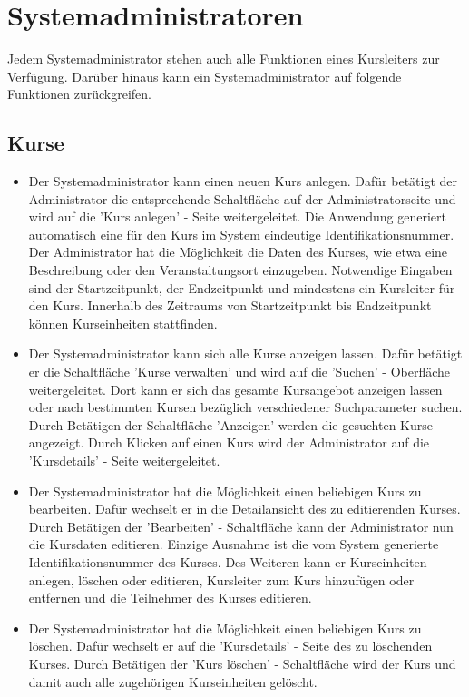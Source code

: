 \documentclass[a4paper]{scrreprt}
\newcounter{Lc}
\newcounter{Hc}
\newcommand{\stepHc}{\stepcounter{Hc}\setcounter{Lc}{0}}
\begin{document}
	\section{Systemadministratoren}
	Jedem Systemadministrator stehen auch alle Funktionen eines Kursleiters zur Verfügung. Darüber hinaus kann ein Systemadministrator auf folgende Funktionen zurückgreifen.
	\stepHc
		\subsection{Kurse}
			\begin{itemize}
				\item {}
					Der Systemadministrator kann einen neuen Kurs anlegen. Dafür betätigt der Administrator die entsprechende Schaltfläche auf der Administratorseite und wird auf die 'Kurs anlegen' - Seite weitergeleitet. Die Anwendung generiert automatisch eine für den Kurs im System eindeutige Identifikationsnummer. Der Administrator hat die Möglichkeit die Daten des Kurses, wie etwa eine Beschreibung oder den Veranstaltungsort einzugeben. Notwendige Eingaben sind der Startzeitpunkt, der Endzeitpunkt und mindestens ein Kursleiter für den Kurs. Innerhalb des Zeitraums von Startzeitpunkt bis Endzeitpunkt können Kurseinheiten stattfinden.
				\item {}
					Der Systemadministrator kann sich alle Kurse anzeigen lassen. Dafür betätigt er die Schaltfläche 'Kurse verwalten' und wird auf die 'Suchen' - Oberfläche weitergeleitet. Dort kann er sich das gesamte Kursangebot anzeigen lassen oder nach bestimmten Kursen bezüglich verschiedener Suchparameter suchen. Durch Betätigen der Schaltfläche 'Anzeigen' werden die gesuchten Kurse angezeigt. Durch Klicken auf einen Kurs wird der Administrator auf die 'Kursdetails' - Seite weitergeleitet.
				\item {}
					Der Systemadministrator hat die Möglichkeit einen beliebigen Kurs zu bearbeiten. Dafür wechselt er in die Detailansicht des zu editierenden Kurses. Durch Betätigen der 'Bearbeiten' - Schaltfläche  kann der Administrator nun die Kursdaten editieren. Einzige Ausnahme ist die vom System generierte Identifikationsnummer des Kurses. Des Weiteren kann er Kurseinheiten anlegen, löschen oder editieren, Kursleiter zum Kurs hinzufügen oder entfernen und die Teilnehmer des Kurses editieren.
				\item {}
					Der Systemadministrator hat die Möglichkeit einen beliebigen Kurs zu löschen. Dafür wechselt er auf die 'Kursdetails' - Seite des zu löschenden Kurses. Durch Betätigen der 'Kurs löschen' - Schaltfläche wird der Kurs und damit auch alle zugehörigen Kurseinheiten gelöscht.
			\end{itemize}
\end{document}
